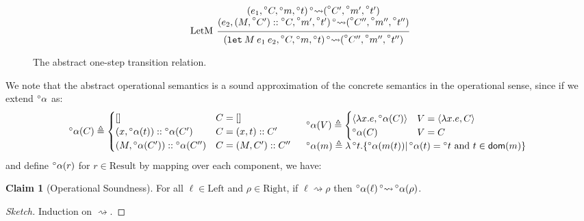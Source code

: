 \documentclass{article}
\theoremstyle{definition}
\newtheorem{clm}{Claim}[section]
\newcommand*{\cons}{::}
\newcommand*{\A}[1]{\prescript{\circ}{}{#1}}
\newcommand*{\Left}{\text{Left}}
\newcommand*{\Right}{\text{Right}}
\newcommand*{\mem}{m}
\newcommand*{\Result}{\text{Result}}
\newcommand*{\semarrow}{\rightsquigarrow}
\begin{document}
\begin{figure}[h!]
  \[
    \begin{prooftree}
      \hypo{
        \begin{matrix}
          (e_{1}, \A{C}, \A\mem, \A{t})
          \A\semarrow
          (\A{C'}, \A{\mem'}, \A{t'}) \\
          (e_{2}, (M, \A{C'})\cons \A{C}, \A{\mem'}, \A{t'})
          \A\semarrow
          (\A{C''}, \A{\mem''}, \A{t''})
        \end{matrix}
      }
      \infer[left label=LetM]1{
      (\mathtt{let}\:M\:e_{1}\:e_{2}, \A{C}, \A\mem, \A{t})
      \A\semarrow
      (\A{C''}, \A{\mem''}, \A{t''})
      }
    \end{prooftree}
  \]
  \caption{The abstract one-step transition relation.}
  \label{fig:absreach1}
\end{figure}

We note that the abstract operational semantics is a sound approximation of the concrete semantics in the operational sense, since if we extend $\A\alpha$ as:
\[
  \begin{array}{cc}
    \A{\alpha}(C)\triangleq
    \begin{cases}
      []                                  & C=[]              \\
      (x,\A{\alpha}(t))::\A{\alpha}(C')   & C=(x,t)\cons C'   \\
      (M,\A{\alpha}(C'))::\A{\alpha}(C'') & C=(M,C')\cons C''
    \end{cases}
     &
    \begin{array}{l}
      \A{\alpha}(V)\triangleq
      \begin{cases}
        \langle \lambda x.e,\A{\alpha}(C)\rangle & V=\langle \lambda x.e,C\rangle \\
        \A{\alpha}(C)                  & V=C
      \end{cases} \\
      \A{\alpha}(\mem)\triangleq\lambda\A{t}.\{\A\alpha(\mem(t))|\A\alpha(t)=\A{t}\text{ and } t\in\mathsf{dom}(\mem)\}
    \end{array}
  \end{array}
\]
and define $\A\alpha(r)$ for $r\in\Result$ by mapping over each component, we have:
\begin{clm}[Operational Soundness]
  For all $\ell\in\Left$ and $\rho\in\Right$, if $\ell\semarrow\rho$ then $\A\alpha(\ell)\A\semarrow\A\alpha(\rho)$.
\end{clm}
\begin{proof}[Sketch]
  Induction on $\semarrow$.
\end{proof}
\end{document}
